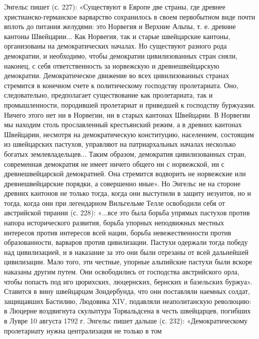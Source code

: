 Энгельс пишет (с.  227): «Существуют в Европе две  страны, где древнее
христианско-германское варварство сохранилось в своем первобытном виде
почти  вплоть  до питания  желудями:  это  Норвегия и  Верхние  Альпы,
т.  е.  древние  кантоны  Швейцарии...  Как  Норвегия,  так  и  старые
швейцарские  кантоны,  организованы  на  демократических  началах.  Но
существуют  разного рода  демократии, и  необходимо, чтобы  демократии
цивилизованных  стран  сняли,  наконец,   с  себя  ответственность  за
норвежскую  и древнешвейцарскую  демократии. Демократическое  движение
во   всех   цивилизованных   странах  стремится   в   конечном   счете
к   политическому   господству   пролетариата.   Оно,   следовательно,
предполагает  существование как  пролетариата,  так и  промышленности,
породившей  пролетариат и  приведшей  к  господству буржуазии.  Ничего
этого нет ни в Норвегии, ни в старых кантонах Швейцарии. В Норвегии мы
находим столь  прославленный крестьянский режим, а  в древних кантонах
Швейцарии,  несмотря   на  демократическую   конституцию,  населением,
состоящим  из   швейцарских  пастухов,  управляют   на  патриархальных
началах несколько богатых землевладельцев... Таким образом, демократия
цивилизованных стран, современная демократия не имеет ничего общего ни
с  норвежской,  ни  с  древнешвейцарской  демократией.  Она  стремится
водворить не  норвежские или  древнешвейцарские порядки,  а совершенно
иные».  Но Энгельс  не на  стороне древних  кантонов не  только тогда,
когда  они  выступили  в  защиту  иезуитов,  но  и  тогда,  когда  они
при  легендарном  Вильгельме  Телле  освободили  себя  от  австрийской
тирании  (с. 228):  «...все это  была борьба  упрямых пастухов  против
напора  исторического  развития,  борьба упорных  неподвижных  местных
интересов  против   интересов  всей  нации,   борьба  невежественности
против образованности,  варваров против цивилизации.  Пастухи одержали
тогда  победу  над  цивилизацией,  и  в  наказание  за  это  они  были
отрезаны  от  всей дальнейшей  цивилизации.  Мало  того, эти  честные,
упорные  альпийские пастухи  были  вскоре наказаны  другим путем.  Они
освободились от  господства австрийского  орла, чтобы попасть  под иго
цюрихских,  люцернских,  бернских  и базельских  буржуа».  Ставится  в
вину  швейцарцам  Зондербунда,  что  они  поставляли  наемных  солдат,
защищавших Бастилию, Людовика XIV, подавляли неаполитанскую революцию:
в  Люцерне воздвигнута  скульптура  Торвальдсена  в честь  швейцарцев,
погибших в  Лувре 10 августа  1792 г.  Энгельс пишет дальше  (с. 232):
«Демократическому  пролетариату нужна  централизация не  только в  том
